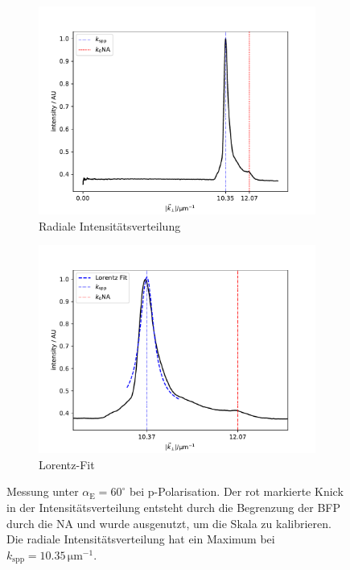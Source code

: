 \documentclass[titlepage,  ngerman]{article}
\begin{document}
\begin{figure}
\begin{subfigure}[b]{0.5\textwidth}
				\centering
			\includegraphics[width=\textwidth]{figures/example_radial.pdf}
			\caption{Radiale Intensitätsverteilung}
			\label{fig:radial_profile}			
		\end{subfigure}
		\hfill
		\begin{subfigure}[b]{0.49\textwidth}
			\centering
			\includegraphics[width=\textwidth]{figures/lorenz_profile}
			\caption{Lorentz-Fit}
			\label{fig:lorenz_profile}			
		\end{subfigure}
	
		\caption[Messwerte bei linearer Polarisation]{Messung unter $\alpha_{\mathrm{E}} = 60^\circ$ bei p-Polarisation.
			Der rot markierte Knick in der Intensitätsverteilung entsteht durch die Begrenzung der BFP durch die NA und wurde ausgenutzt, um die Skala zu kalibrieren. Die radiale Intensitätsverteilung hat ein Maximum bei $k_{\mathrm{spp}}= 10.35\,\mathrm{\mu m ^{-1}}$.}			
	\end{figure}
\end{document}
